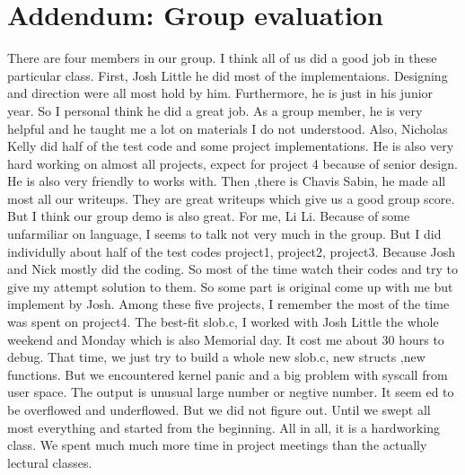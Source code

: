 \documentclass[12pt,letterpaper]{article}
\begin{document}
\section{Addendum: Group evaluation}
\indent There are four members in our group. I think all of us did a good job in these particular class.\newline
\indent First, Josh Little he did most of the implementaions. Designing and direction were all most hold by him. Furthermore, he is just in his junior year. So I personal think he did a great job. As a group member, he is very helpful and he taught me a lot on materials I do not understood.\newline
\indent Also, Nicholas Kelly did half of the test code and some project implementations. He is also very hard working on almost all projects, expect for project 4 because of senior design. He is also very friendly to works with.\newline
\indent Then ,there is Chavis Sabin, he made all most all our writeups. They are great writeups which give us a good group score. But I think our group demo is also great.\newline
\indent For me, Li Li. Because of some unfarmiliar on language, I seems to talk not very much in the group. But I did individully about half of the test codes project1, project2, project3. Because Josh and Nick mostly did the coding. So most of the time watch their codes and try to give my attempt solution to them. So some part is original come up with me but implement by Josh. Among these five projects, I remember the most of the time was spent on project4. The best-fit slob.c, I worked with Josh Little the whole weekend and Monday which is also Memorial day. It cost me about 30 hours to debug. That time, we just try to build a whole new slob.c, new structs ,new functions. But we encountered kernel panic and a big problem with syscall from user space. The output is unusual large number or negtive number. It seem ed to be overflowed and underflowed. But we did not figure out. Until we swept all most everything and started from the beginning.\newline
\indent All in all, it is a hardworking class. We spent much much more time in project meetings than the actually lectural classes.
\end{document}
